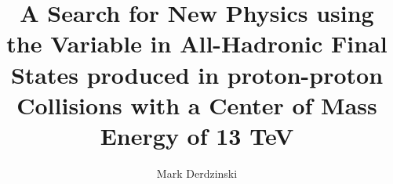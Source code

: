 \title{A Search for New Physics using the \mttwo Variable in All-Hadronic Final States produced in proton-proton Collisions with a Center of Mass Energy of 13 TeV}

\author{Mark Derdzinski}






